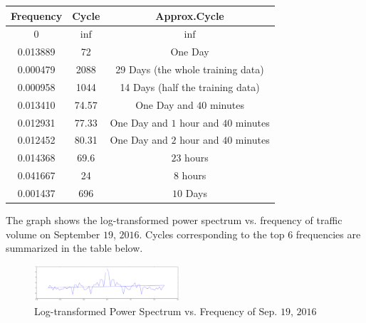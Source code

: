 \documentclass[journal, letterpaper]{IEEEtran}
\begin{document}
\begin{table}[ht]
\centering %
\begin{tabular}{c| c| c } %
\hline\hline %
Frequency & Cycle & Approx.Cycle \\ %
\hline %
0 & $\inf$ & $\inf$ \\
\hline
0.013889 & 72 & One Day   \\ %
\hline
0.000479 & 2088 & 29 Days (the whole training data) \\
\hline
0.000958 & 1044 & 14 Days (half the training data) \\
\hline
0.013410 & 74.57 & One Day and $40$ minutes\\
\hline
0.012931 & 77.33 & One Day and $1$ hour and $40$ minutes \\
\hline
0.012452 & 80.31 & One Day and $2$ hour and $40$ minutes \\
\hline
0.014368 & 69.6 & $23$ hours \\
\hline
0.041667 & 24 &  $8$ hours\\
\hline
0.001437 & 696 & $10$ Days \\
\hline %
\end{tabular}
\label{table:nonlin} %
\end{table}

The graph shows the log-transformed power spectrum vs. frequency of traffic volume on September $19$, $2016$. Cycles corresponding to the top $6$ frequencies are summarized in the table below.

\begin{figure} [H]
  \centering
  \includegraphics[width=0.48\textwidth]{ft_oneday.png}
  \caption{Log-transformed Power Spectrum vs. Frequency of Sep. $19$, $2016$}
  \label{fig:17}
\end{figure}
\end{document}
